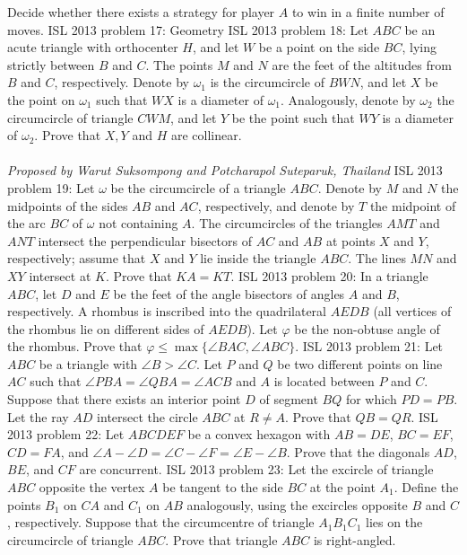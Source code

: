 Decide whether there exists a strategy for player $A$ to win in a finite number of moves. 
ISL 2013 problem 17:  Geometry 
ISL 2013 problem 18:  Let $ABC$ be an acute triangle with orthocenter $H$, and let $W$ be a point on the side $BC$, lying strictly between $B$ and $C$. The points $M$ and $N$ are the feet of the altitudes from $B$ and $C$, respectively. Denote by $\omega_1$ is the circumcircle of $BWN$, and let $X$ be the point on $\omega_1$ such that $WX$ is a diameter of $\omega_1$. Analogously, denote by $\omega_2$ the circumcircle of triangle $CWM$, and let $Y$ be the point such that $WY$ is a diameter of $\omega_2$. Prove that $X,Y$ and $H$ are collinear. \\\\
\textit{Proposed by Warut Suksompong and Potcharapol Suteparuk, Thailand} 
ISL 2013 problem 19:  Let $\omega$ be the circumcircle of a triangle $ABC$. Denote by $M$ and $N$ the midpoints of the sides $AB$ and $AC$, respectively, and denote by $T$ the midpoint of the arc $BC$ of $\omega$ not containing $A$. The circumcircles of the triangles $AMT$ and $ANT$ intersect the perpendicular bisectors of $AC$ and $AB$ at points $X$ and $Y$, respectively; assume that $X$ and $Y$ lie inside the triangle $ABC$. The lines $MN$ and $XY$ intersect at $K$. Prove that $KA=KT$. 
ISL 2013 problem 20:  In a triangle $ABC$, let $D$ and $E$ be the feet of the angle bisectors of angles $A$ and $B$, respectively. A rhombus is inscribed into the quadrilateral $AEDB$ (all vertices of the rhombus lie on different sides of $AEDB$). Let $\varphi$ be the non-obtuse angle of the rhombus. Prove that $\varphi \le \max \{  \angle BAC, \angle ABC  \}$. 
ISL 2013 problem 21:  Let $ABC$ be a triangle with $\angle B > \angle C$. Let $P$ and $Q$ be two different points on line $AC$ such that $\angle PBA = \angle QBA = \angle ACB $ and $A$ is located between $P$ and $C$. Suppose that there exists an interior point $D$ of segment $BQ$ for which $PD=PB$. Let the ray $AD$ intersect the circle $ABC$ at $R \neq A$. Prove that $QB = QR$. 
ISL 2013 problem 22:  Let $ABCDEF$ be a convex hexagon with $AB=DE$, $BC=EF$, $CD=FA$, and $\angle A-\angle D = \angle C -\angle F = \angle E -\angle B$. Prove that the diagonals $AD$, $BE$, and $CF$ are concurrent. 
ISL 2013 problem 23:  Let the excircle of triangle $ABC$ opposite the vertex $A$ be tangent to the side $BC$ at the point $A_1$. Define the points $B_1$ on $CA$ and $C_1$ on $AB$ analogously, using the excircles opposite $B$ and $C$, respectively. Suppose that the circumcentre of triangle $A_1B_1C_1$ lies on the circumcircle of triangle $ABC$. Prove that triangle $ABC$ is right-angled. \\\\
